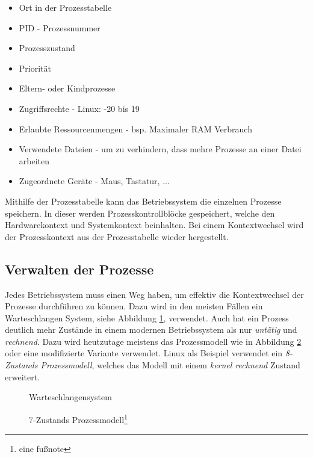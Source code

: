 \begin{itemize}
    \setlength\itemsep{0pt}
    \item Ort in der Prozesstabelle
    \item PID - Prozessnummer
    \item Prozesszustand
    \item Priorität
    \item Eltern- oder Kindprozesse
    \item Zugriffsrechte - Linux: -20 bis 19
    \item Erlaubte Ressourcenmengen - bsp. Maximaler RAM Verbrauch
    \item Verwendete Dateien - um zu verhindern, dass mehre Prozesse an einer Datei arbeiten
    \item Zugeordnete Geräte - Maus, Tastatur, ...
\end{itemize}

Mithilfe der Prozesstabelle kann das Betriebssystem die einzelnen Prozesse speichern. In dieser werden Prozesskontrollblöcke gespeichert, welche den Hardwarekontext und Systemkontext beinhalten. Bei einem Kontextwechsel wird der Prozesskontext aus der Prozesstabelle wieder hergestellt.

\newpage

\subsection{Verwalten der Prozesse}

Jedes Betriebssystem muss einen Weg haben, um effektiv die Kontextwechsel der Prozesse durchführen zu können. Dazu wird in den meisten Fällen ein Warteschlangen System, siehe Abbildung \ref{Warteschlange Prozesse}, verwendet. Auch hat ein Prozess deutlich mehr Zustände in einem modernen Betriebssystem als nur \textit{untätig} und \textit{rechnend}. Dazu wird heutzutage meistens das Prozessmodell wie in Abbildung \ref{Prozessmodell} oder eine modifizierte Variante verwendet. Linux als Beispiel verwendet ein \textit{8-Zustands Prozessmodell}, welches das Modell mit einem \textit{kernel rechnend} Zustand erweitert.

\begin{figure}[h]
    \centering
    
    \caption{Warteschlangensystem\protect\footnotemark}
    \label{Warteschlange Prozesse}
\end{figure}
\begin{figure}[h]
    \centering
    
    \caption{7-Zustands Prozessmodell\protect\footnote{eine fußnote}}
    \label{Prozessmodell}
\end{figure}

